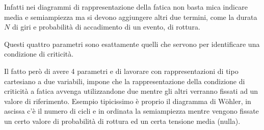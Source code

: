 		Infatti nei diagrammi di rappresentazione della fatica non basta mica indicare media e semiampiezza ma si devono aggiungere altri due termini, come la durata $ N $ di giri e probabilità di accadimento di un evento, di rottura.
		 
		Questi quattro parametri sono esattamente quelli che servono per identificare una condizione di criticità.
		
		Il fatto però di avere 4 parametri e di lavorare con rappresentazioni di tipo cartesiano a due variabili, impone che la rappresentazione della condizione di criticità a fatica avvenga utilizzandone due mentre gli altri verranno fissati ad un valore di riferimento. Esempio tipicissimo è proprio il diagramma di Wöhler, in ascissa c'è il numero di cicli e in ordinata la semiampiezza mentre vengono fissate un certo valore di probabilità di rottura ed un certa tensione media (nulla). \newline
		 
